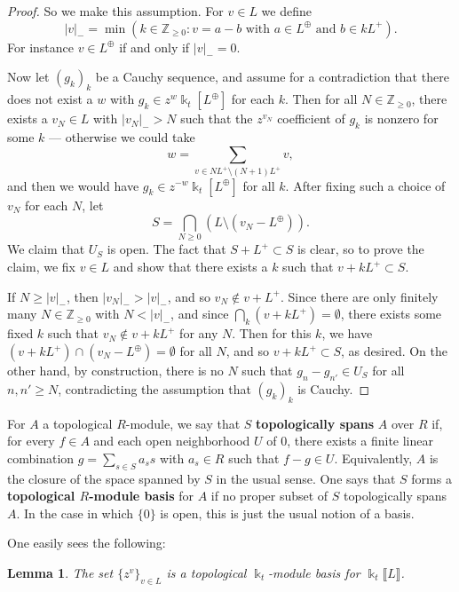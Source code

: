 \documentclass{amsart}
\let\llb=\llbracket
\let\rrb=\rrbracket
\let\bb=\mathbb
\newcommand {\kk} {\Bbbk}
\newcommand {\kt} {\kk_t}
\theoremstyle{plain}%
\newtheorem{lem}[thm]{Lemma}
\theoremstyle{definition}
\theoremstyle{remark}
\begin{document}
\begin{proof}
So we make this assumption.  For $v\in L$ we define 
\[
\lvert v\lvert_-=\min(k\in\mathbb{Z}_{\geq0} \colon v=a-b \textrm{ with }a\in L^{\oplus}\textrm{ and }b\in kL^+).
\]
For instance $v\in L^{\oplus}$ if and only if $\lvert v\lvert_-=0$.

Now let $(g_k)_k$ be a Cauchy sequence, and assume for a contradiction that there does not exist a $w$ with $g_{k}\in z^{w}\kk_t[L^{\oplus}]$ for each $k$.  Then for all $N\in \mathbb{Z}_{\geq 0}$, there exists a $v_N\in L$ with $\lvert v_N\lvert_- > N$ such that the $z^{v_N}$ coefficient of $g_k$ is nonzero for some $k$ 
--- otherwise we could take 
\[
w=\sum_{v\in NL^+\setminus (N+1)L^+}v,
\]
and then we would have $g_k\in z^{-w}\kk_t[L^{\oplus}]$ for all $k$.  
After fixing such a choice of $v_N$ for each $N$, let 
\[
S=\bigcap_{N\geq 0} (L\setminus (v_N-L^{\oplus})). 
\]
We claim that $U_S$ is open.  The fact that $S+L^+\subset S$ is clear, so to prove the claim, we fix $v\in L$ and show that there exists a $k$ such that $v+kL^+\subset S$.


If $N\geq |v|_-$, then $|v_N|_->|v|_-$, and so $v_N\notin v+L^+$.  Since there are only finitely many $N\in \bb{Z}_{\geq 0}$ with $N<|v|_-$, and since $\bigcap_k (v+kL^+)=\emptyset$, there exists some fixed $k$ such that $v_N\notin v+kL^+$ for any $N$.  Then for this $k$, we have $(v+kL^+)\cap (v_N-L^{\oplus})=\emptyset$ for all $N$, and so $v+kL^+\subset S$, as desired.  On the other hand, by construction, there is no $N$ such that $g_n-g_{n'}\in U_S$ for all $n,n'\geq N$, contradicting the assumption that $(g_k)_k$ is Cauchy. 
\end{proof}



For $A$ a topological $R$-module, we say that $S$ \textbf{topologically spans} $A$ over $R$ if, for every $f\in A$ and each open neighborhood $U$ of $0$, there exists a finite linear combination $g=\sum_{s\in S} a_s s$ with $a_s\in R$ such that $f-g\in U$.  Equivalently, $A$ is the closure of the space spanned by $S$ in the usual sense.  One says that $S$ forms a \textbf{topological $R$-module basis} for $A$ if no proper subset of $S$ topologically spans $A$.  In the case in which $\{0\}$ is open, this is just the usual notion of a basis.


One easily sees the following:
\begin{lem}\label{zbas}
The set $\{z^v\}_{v\in L}$ is a topological $\kt$-module basis for $\kk_t\llb L\rrb$.
\end{lem}
\end{document}
